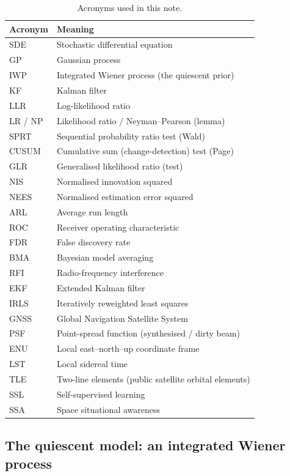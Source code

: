 \documentclass[11pt]{article}
\begin{document}
\begin{table}[h]
\centering
\small
\begin{tabular}{ll}
\toprule
Acronym & Meaning \\
\midrule
SDE   & Stochastic differential equation \\
GP    & Gaussian process \\
IWP   & Integrated Wiener process (the quiescent prior) \\
KF    & Kalman filter \\
LLR   & Log-likelihood ratio \\
LR / NP & Likelihood ratio / Neyman--Pearson (lemma) \\
SPRT  & Sequential probability ratio test (Wald) \\
CUSUM & Cumulative sum (change-detection) test (Page) \\
GLR   & Generalised likelihood ratio (test) \\
NIS   & Normalised innovation squared \\
NEES  & Normalised estimation error squared \\
ARL   & Average run length \\
ROC   & Receiver operating characteristic \\
FDR   & False discovery rate \\
BMA   & Bayesian model averaging \\
RFI   & Radio-frequency interference \\
EKF   & Extended Kalman filter \\
IRLS  & Iteratively reweighted least squares \\
GNSS  & Global Navigation Satellite System \\
PSF   & Point-spread function (synthesised / dirty beam) \\
ENU   & Local east--north--up coordinate frame \\
LST   & Local sidereal time \\
TLE   & Two-line elements (public satellite orbital elements) \\
SSL   & Self-supervised learning \\
SSA   & Space situational awareness \\
\bottomrule
\end{tabular}
\caption{Acronyms used in this note.}
\label{tab:acro}
\end{table}

\subsection{The quiescent model: an integrated Wiener process}
\label{sec:iwp}
\end{document}
